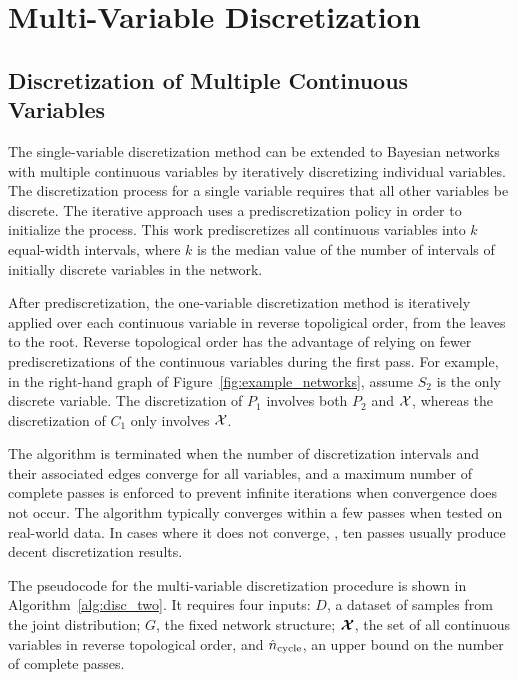 
\section{Multi-Variable Discretization}
\label{sec:multi_var}

\subsection{Discretization of Multiple Continuous Variables}

The single-variable discretization method can be extended to Bayesian networks with multiple continuous variables by iteratively discretizing individual variables.
The discretization process for a single variable requires that all other variables be discrete.
The iterative approach uses a prediscretization policy in order to initialize the process.
This work prediscretizes all continuous variables into $k$ equal-width intervals, where $k$ is the median value of the number of intervals of initially discrete variables in the network.

After prediscretization, the one-variable discretization method is iteratively applied over each continuous variable in reverse topoligical order, from the leaves to the root.
Reverse topological order has the advantage of relying on fewer prediscretizations of the continuous variables during the first pass.
For example, in the right-hand graph of Figure~\ref{fig:example_networks}, assume $S_2$ is the only discrete variable.
The discretization of $P_1$ involves both $P_2$ and $\mathcal{X}$, whereas the discretization of $C_1$ only involves $\mathcal{X}$.

The algorithm is terminated when the number of discretization intervals and their associated edges converge for all variables, and a maximum number of complete passes is enforced to prevent infinite iterations when convergence does not occur.
The algorithm typically converges within a few passes when tested on real-world data.
In cases where it does not converge, , ten passes usually produce decent discretization results.

The pseudocode for the multi-variable discretization procedure is shown in Algorithm~\ref{alg:disc_two}.
It requires four inputs: $D$, a dataset of samples from the joint distribution; $G$, the fixed network structure; $\bm{\mathcal{X}}$, the set of all continuous variables in reverse topological order, and $\hat{n}_\text{cycle}$, an upper bound on the number of complete passes.

